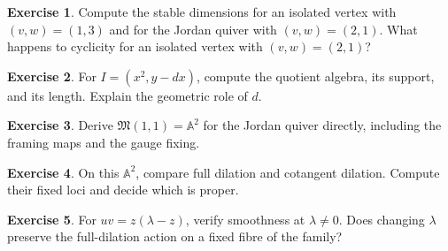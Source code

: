 \documentclass[11pt,a4paper]{article}
\numberwithin{equation}{section}
\theoremstyle{definition}
\newtheorem{exercise}{Exercise}
\newcommand{\A}{\mathbb A}
\newcommand{\M}{\mathfrak M}
\begin{document}
\begin{exercise}\label{ex:dimensions}
Compute the stable dimensions for an isolated vertex with
$(v,w)=(1,3)$ and for the Jordan quiver with $(v,w)=(2,1)$.
What happens to cyclicity for an isolated vertex with $(v,w)=(2,1)$?
\end{exercise}
\begin{exercise}\label{ex:ideal}
For $I=(x^2,y-dx)$, compute the quotient algebra, its support,
and its length. Explain the geometric role of $d$.
\end{exercise}
\begin{exercise}\label{ex:jordanone}
Derive $\M(1,1)=\A^2$ for the Jordan quiver directly, including
the framing maps and the gauge fixing.
\end{exercise}
\begin{exercise}\label{ex:scaling}
On this $\A^2$, compare full dilation and cotangent dilation.
Compute their fixed loci and decide which is proper.
\end{exercise}
\begin{exercise}\label{ex:deform}
For $uv=z(\lambda-z)$, verify smoothness at $\lambda\ne0$.
Does changing $\lambda$ preserve the full-dilation action
on a fixed fibre of the family?
\end{exercise}
\end{document}

